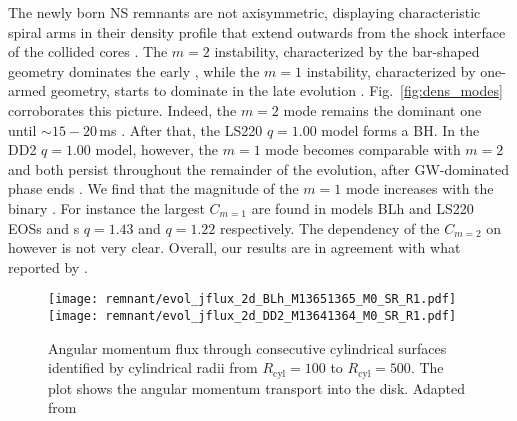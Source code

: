 %
The newly born \ac{NS} remnants are not axisymmetric, displaying characteristic 
spiral arms in their density profile that extend outwards from the shock interface of the collided cores 
\citep{Shibata:1999wm,Shibata:2006nm,Bernuzzi:2013rza,Kastaun:2014fna,East:2015vix,Paschalidis:2015mla,Radice:2016gym,Lehner:2016wjg}.
%
%
The $m=2$ instability, characterized by the bar-shaped geometry dominates  the early \pmerg{}, while the $m=1$ instability, characterized by one-armed geometry,  
starts to dominate in the late evolution 
\citep{East:2015vix,Paschalidis:2015mla,Radice:2016gym,Lehner:2016wjg,Bernuzzi:2013rza,Kastaun:2014fna}.
Fig.~\ref{fig:dens_modes} corroborates this picture.
%
%
Indeed, the $m=2$ mode remains the dominant one until ${\sim}15-20\,$ms \pmerg{}. 
After that, the 
LS220 $q=1.00$ model 
forms a \ac{BH}. 
In the 
DD2 $q=1.00$ model, 
however, the $m=1$ mode 
becomes comparable with $m=2$ and both persist throughout the remainder of the evolution,
after \ac{GW}-dominated phase ends 
\citep{Bernuzzi:2015opx,Radice:2016gym}.
%
%
We find that the magnitude of the $m=1$ mode increases with the binary \mr{}.
For instance the largest $C_{m=1}$ are found in models BLh and LS220 \acp{EOS}
and \mr{}s $q=1.43$ and $q=1.22$ respectively. 
The dependency of the $C_{m=2}$ on \mr{} however is not very clear. 
Overall, our results are in agreement with what 
reported by \citet{Lehner:2016wjg}.


\begin{figure}[t]
    \centering 
    \texttt{[image: remnant/evol\_jflux\_2d\_BLh\_M13651365\_M0\_SR\_R1.pdf]}
    \texttt{[image: remnant/evol\_jflux\_2d\_DD2\_M13641364\_M0\_SR\_R1.pdf]}
    \caption{Angular momentum flux through consecutive cylindrical
        surfaces identified by cylindrical radii from $R_{\text{cyl}}=100$ to $R_{\text{cyl}}=500$. The
        plot shows the angular momentum transport into the disk.
        Adapted from \citet{Nedora:2020pak}
    }
    \label{fig:disk_ang_mom_flux_map_blh_q1}
\end{figure}


